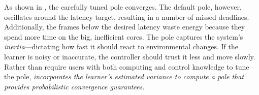 As shown in , the carefully tuned pole
converges. The default pole, however, oscillates around the
latency target, resulting in a number of missed deadlines.
Additionally, the frames below the desired latency waste
energy because they spend more time on the big, inefficient cores. The
pole captures the system's \emph{inertia}---dictating how fast it
should react to environmental changes.  If the learner is noisy or
inaccurate, the controller should trust it less and move slowly.
Rather than require users with both computing and control knowledge to
tune the pole, \emph{\SYSTEM{} incorporates the learner's estimated
  variance to compute a pole that provides probabilistic convergence
  guarantees.}


